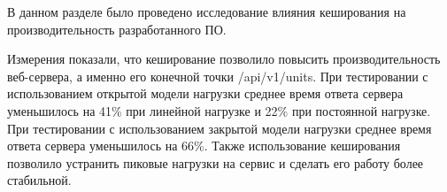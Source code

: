 

В данном разделе было проведено исследование влияния кеширования на производительность разработанного ПО.

Измерения показали, что кеширование позволило повысить производительность веб-сервера, а именно его конечной точки /api/v1/units. При тестировании с использованием открытой модели нагрузки среднее время ответа сервера уменьшилось на 41\% при линейной нагрузке и 22\% при постоянной нагрузке. При тестировании с использованием закрытой модели нагрузки среднее время ответа сервера уменьшилось на 66\%. Также использование кеширования позволило устранить пиковые нагрузки на сервис и сделать его работу более стабильной.



\pagebreak